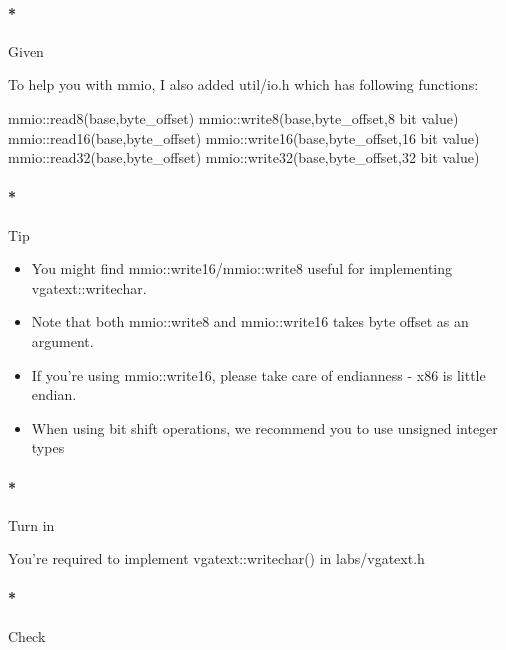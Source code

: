 \documentclass[]{article}
\newenvironment{Shaded}{}{}
\newcommand{\DecValTok}[1]{\textcolor[rgb]{0.00,0.00,1.00}{{#1}}}
\newcommand{\NormalTok}[1]{{#1}}
\providecommand{\tightlist}{%
  \setlength{\itemsep}{0pt}\setlength{\parskip}{0pt}}
\let\oldparagraph\paragraph
\renewcommand{\paragraph}[1]{\oldparagraph{#1}\mbox{}}
\begin{document}
\paragraph*{Given}\label{given}

To help you with mmio, I also added util/io.h which has following
functions:

\begin{Shaded}
\begin{Highlighting}[]
       \NormalTok{mmio::read8(base,byte_offset)}
       \NormalTok{mmio::write8(base,byte_offset,}\DecValTok{8} \NormalTok{bit value)}
       \NormalTok{mmio::read16(base,byte_offset)}
       \NormalTok{mmio::write16(base,byte_offset,}\DecValTok{16} \NormalTok{bit value)}
       \NormalTok{mmio::read32(base,byte_offset)}
       \NormalTok{mmio::write32(base,byte_offset,}\DecValTok{32} \NormalTok{bit value)}
\end{Highlighting}
\end{Shaded}

\paragraph*{Tip}\label{tip}

\begin{itemize}
\tightlist
\item
  You might find mmio::write16/mmio::write8 useful for implementing
  vgatext::writechar.
\item
  Note that both mmio::write8 and mmio::write16 takes byte offset as an
  argument.
\item
  If you're using mmio::write16, please take care of endianness - x86 is
  little endian.
\item
  When using bit shift operations, we recommend you to use unsigned
  integer types
\end{itemize}

\paragraph*{Turn in}\label{turn-in}

You're required to implement vgatext::writechar() in labs/vgatext.h

\paragraph*{Check}\label{check}
\end{document}
